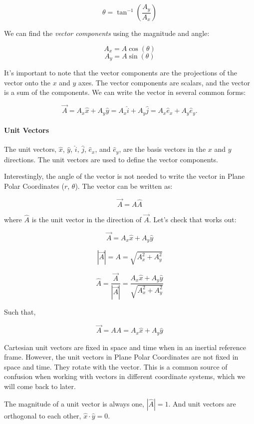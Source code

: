 \documentclass[11pt]{article}
\begin{document}
\[\theta = \tan^{-1}\left(\dfrac{A_y}{A_x}\right)\]

We can find the \emph{vector components} using the magnitude and angle:

\[A_x = A\cos(\theta)\] \[A_y = A\sin(\theta)\]

It's important to note that the vector components are the projections of
the vector onto the \(x\) and \(y\) axes. The vector components are
scalars, and the vector is a sum of the components. We can write the
vector in several common forms:

\[\vec{A} = A_x\hat{x} + A_y\hat{y}  = A_x\hat{i} + A_y\hat{j} = A_x\hat{e}_x + A_y\hat{e}_y.\]

\paragraph{Unit Vectors}\label{unit-vectors}

The unit vectors, \(\hat{x}\), \(\hat{y}\), \(\hat{i}\), \(\hat{j}\),
\(\hat{e}_x\), and \(\hat{e}_y\), are the basis vectors in the \(x\) and
\(y\) directions. The unit vectors are used to define the vector
components.

Interestingly, the angle of the vector is not needed to write the vector
in Plane Polar Coordinates (\(r\), \(\theta\)). The vector can be
written as:

\[\vec{A} = A\hat{A}\]

where \(\hat{A}\) is the unit vector in the direction of \(\vec{A}\).
Let's check that works out:

\[\vec{A} = A_x\hat{x} + A_y\hat{y}\]

\[|\vec{A}| = A = \sqrt{A_x^2 + A_y^2}\]

\[\hat{A} = \dfrac{\vec{A}}{|\vec{A}|} = \dfrac{A_x\hat{x} + A_y\hat{y}}{\sqrt{A_x^2 + A_y^2}}\]

Such that,

\[\vec{A} = A\hat{A} = A_x\hat{x} + A_y\hat{y}\]

Cartesian unit vectors are fixed in space and time when in an inertial
reference frame. However, the unit vectors in Plane Polar Coordinates
are not fixed in space and time. They rotate with the vector. This is a
common source of confusion when working with vectors in different
coordinate systems, which we will come back to later.

The magnitude of a unit vector is always one, \(|\hat{A}| = 1\). And
unit vectors are orthogonal to each other,
\(\hat{x} \cdot \hat{y} = 0\).
\end{document}
